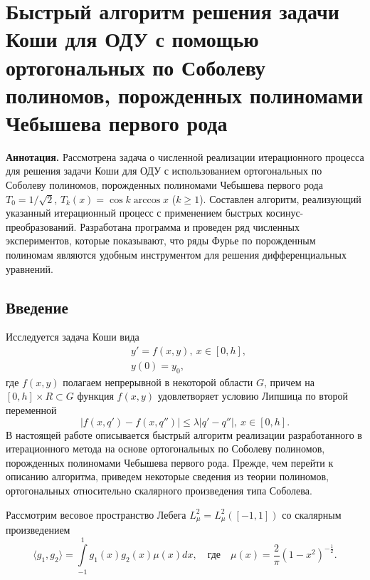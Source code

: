 \section{Быстрый алгоритм решения задачи Коши для ОДУ с помощью ортогональных по Соболеву полиномов, порожденных полиномами Чебышева первого рода}

\textbf{Аннотация.} Рассмотрена задача о численной реализации итерационного процесса для решения задачи Коши для ОДУ с использованием ортогональных по Соболеву полиномов, порожденных полиномами Чебышева первого рода $T_0=1/\sqrt{2}$, $T_k(x)=\cos k\arccos x$ ($k\ge1$). Составлен алгоритм, реализующий указанный итерационный процесс с применением быстрых косинус-преобразова\-ний. Разработана программа и проведен ряд численных экспериментов, которые показывают, что ряды Фурье по порожденным полиномам являются удобным инструментом для решения дифференциальных уравнений.

\subsection{Введение}

Исследуется задача Коши вида
\begin{equation}\label{sms-stn-2-CauchyProbl}
\begin{aligned}
&y'=f(x,y),\ x\in[0,h],\\
&y(0)=y_0,
\end{aligned}
\end{equation}
где $f(x,y)$ полагаем непрерывной в некоторой области $G$, причем на $[0,h]\times R\subset G$ функция $f(x,y)$ удовлетворяет условию Липшица по второй переменной
\begin{equation}\label{sms-stn-2-LipSecVar}
|f(x,q')-f(x,q'')|\le\lambda|q'-q''|,\ x\in[0,h].
\end{equation}
В настоящей работе описывается быстрый алгоритм реализации разработанного в \cite{sms-stn-2-PolOrtPorSobChebUrav} итерационного метода на основе ортогональных по Соболеву полиномов, порожденных полиномами Чебышева первого рода. Прежде, чем перейти к описанию алгоритма, приведем некоторые сведения из теории полиномов, ортогональных относительно скалярного произведения типа Соболева.

Рассмотрим весовое пространство Лебега $L_\mu^2=L_\mu^2([-1,1])$ со скалярным произведением
\begin{equation*}
\langle g_1,g_2\rangle=\int\limits_{-1}^1g_1(x)g_2(x)\mu(x)dx,
\quad
\text{где}
\quad
\mu(x)=\frac2\pi(1-x^2)^{-\frac12}.
\end{equation*}

